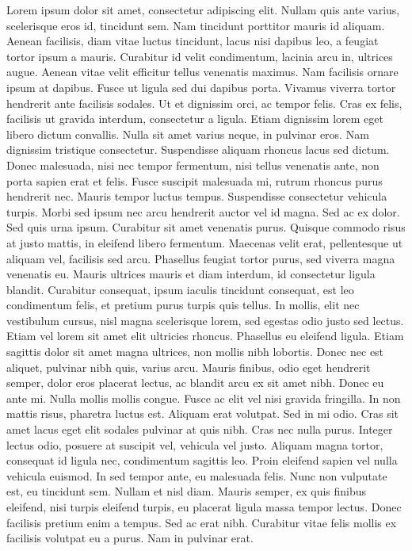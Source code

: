 	Lorem ipsum dolor sit amet, consectetur adipiscing elit. Nullam quis ante varius, scelerisque eros id, tincidunt sem. Nam tincidunt porttitor mauris id aliquam. Aenean facilisis, diam vitae luctus tincidunt, lacus nisi dapibus leo, a feugiat tortor ipsum a mauris. Curabitur id velit condimentum, lacinia arcu in, ultrices augue. Aenean vitae velit efficitur tellus venenatis maximus. Nam facilisis ornare ipsum at dapibus. Fusce ut ligula sed dui dapibus porta. Vivamus viverra tortor hendrerit ante facilisis sodales. Ut et dignissim orci, ac tempor felis. Cras ex felis, facilisis ut gravida interdum, consectetur a ligula.
	Etiam dignissim lorem eget libero dictum convallis. Nulla sit amet varius neque, in pulvinar eros. Nam dignissim tristique consectetur. Suspendisse aliquam rhoncus lacus sed dictum. Donec malesuada, nisi nec tempor fermentum, nisi tellus venenatis ante, non porta sapien erat et felis. Fusce suscipit malesuada mi, rutrum rhoncus purus hendrerit nec. Mauris tempor luctus tempus. Suspendisse consectetur vehicula turpis. Morbi sed ipsum nec arcu hendrerit auctor vel id magna. Sed ac ex dolor. Sed quis urna ipsum. Curabitur sit amet venenatis purus. Quisque commodo risus at justo mattis, in eleifend libero fermentum. Maecenas velit erat, pellentesque ut aliquam vel, facilisis sed arcu. Phasellus feugiat tortor purus, sed viverra magna venenatis eu. Mauris ultrices mauris et diam interdum, id consectetur ligula blandit.
	Curabitur consequat, ipsum iaculis tincidunt consequat, est leo condimentum felis, et pretium purus turpis quis tellus. In mollis, elit nec vestibulum cursus, nisl magna scelerisque lorem, sed egestas odio justo sed lectus. Etiam vel lorem sit amet elit ultricies rhoncus. Phasellus eu eleifend ligula. Etiam sagittis dolor sit amet magna ultrices, non mollis nibh lobortis. Donec nec est aliquet, pulvinar nibh quis, varius arcu. Mauris finibus, odio eget hendrerit semper, dolor eros placerat lectus, ac blandit arcu ex sit amet nibh. Donec eu ante mi. Nulla mollis mollis congue. Fusce ac elit vel nisi gravida fringilla. In non mattis risus, pharetra luctus est. Aliquam erat volutpat. Sed in mi odio. Cras sit amet lacus eget elit sodales pulvinar at quis nibh.
	Cras nec nulla purus. Integer lectus odio, posuere at suscipit vel, vehicula vel justo. Aliquam magna tortor, consequat id ligula nec, condimentum sagittis leo. Proin eleifend sapien vel nulla vehicula euismod. In sed tempor ante, eu malesuada felis. Nunc non vulputate est, eu tincidunt sem. Nullam et nisl diam. Mauris semper, ex quis finibus eleifend, nisi turpis eleifend turpis, eu placerat ligula massa tempor lectus. Donec facilisis pretium enim a tempus. Sed ac erat nibh. Curabitur vitae felis mollis ex facilisis volutpat eu a purus. Nam in pulvinar erat.
